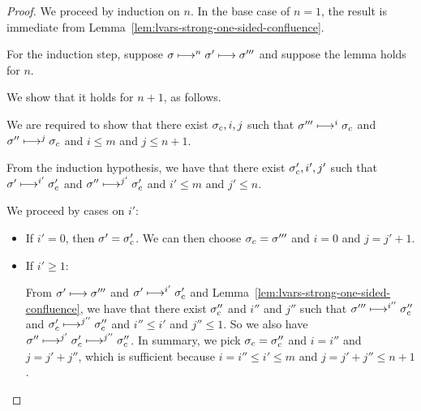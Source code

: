 \begin{proof}

  We proceed by induction on $n$.  In the base case of $n = 1$, the
  result is immediate from
  Lemma~\ref{lem:lvars-strong-one-sided-confluence}.

  For the induction step, suppose $\sigma \longmapsto^n \sigma'
  \longmapsto \sigma'''$ and suppose the lemma holds for $n$.

  We show that it holds for $n + 1$, as follows.

  We are required to show that there exist $\sigma_c, i, j$ such that
  $\sigma''' \longmapsto^i \sigma_c$ and $\sigma'' \longmapsto^j \sigma_c$
  and $i \leq m$ and $j \leq n + 1$.

  From the induction hypothesis, we have that there exist $\sigma'_c,
  i', j'$ such that $\sigma' \longmapsto^{i'} \sigma'_c$ and $\sigma''
  \longmapsto^{j'} \sigma'_c$ and $i' \leq m$ and $j' \leq n$.

  We proceed by cases on $i'$:
  \begin{itemize}

  \item If $i' = 0$, then $\sigma' = \sigma_c'$.  We can then choose
    $\sigma_c = \sigma'''$ and $i = 0$ and $j = j' + 1$.

  \item If $i' \geq 1$:

    From $\sigma' \longmapsto \sigma'''$ and $\sigma' \longmapsto^{i'}
    \sigma_c'$ and Lemma~\ref{lem:lvars-strong-one-sided-confluence},
    we have that there exist $\sigma_c''$ and $i''$ and $j''$ such that
    $\sigma''' \longmapsto^{i''} \sigma_c''$ and $\sigma_c'
    \longmapsto^{j''} \sigma_c''$ and $i'' \leq i'$ and $j'' \leq 1$.
    So we also have $\sigma'' \longmapsto^{j'} \sigma_c'
    \longmapsto^{j''} \sigma_c''$.  In summary, we pick $\sigma_c =
    \sigma_c''$ and $i = i''$ and $j = j' + j''$, which is sufficient
    because $i = i'' \leq i' \leq m$ and $j = j' + j'' \leq n + 1$.
  \end{itemize}

\end{proof}
